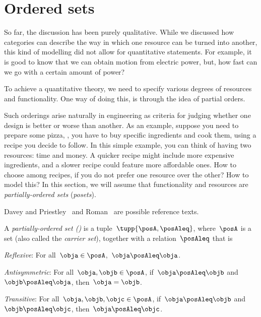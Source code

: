 

\section{Ordered sets} \label{sec:tradeoffs-ordered-sets}


So far, the discussion has been purely qualitative. While we discussed how
categories can describe the way in which one resource can be turned into another,
this kind of modelling did not allow for quantitative statements. For example, it
is good to know that we can obtain motion from electric power, but, how fast can
we go with a certain amount of power?

To achieve a quantitative theory, we need to specify various degrees of resources and functionality.
One way of doing this, is through the idea of partial orders.


Such orderings arise naturally in engineering as criteria for judging whether one design is better or worse than another. As an example, suppose you need to prepare some pizza, \ie , you have to buy specific ingredients and cook them, using a recipe you decide to follow. In this simple example, you can think of having two resources: time and money. A quicker recipe might include more expensive ingredients, and a slower recipe could feature more affordable ones. How to choose among recipes, if you do not prefer one resource over the other? How to model this? In this section, we will assume that functionality and resources
are \emph{partially-ordered sets} (\emph{posets}).

Davey and Priestley~\cite{davey02}
and Roman~\cite{roman08} are possible reference texts.



\begin{definition}
  \label{def:poset}
  A \emph{partially-ordered set ()} is a tuple~$\tupp{\posA,\posAleq}$,
  where~$\posA$ is a set (also called the \emph{carrier set}), together with a
  relation~$\posAleq$   that is
  \begin{compactenum}
    \item \emph{Reflexive}: For all~$\obja\in \posA$,~$\obja \posAleq \obja$.
    \item \emph{Antisymmetric}: For all~$\obja,\objb\in \posA$, if~$\obja\posAleq \objb$ and~$\objb\posAleq \obja$, then~$\obja=\objb$.
    \item \emph{Transitive}: For all~$\obja,\objb,\objc\in \posA$, if~$\obja\posAleq \objb$ and~$\objb\posAleq \objc$, then~$\obja\posAleq \objc$.
  \end{compactenum}
\end{definition}

